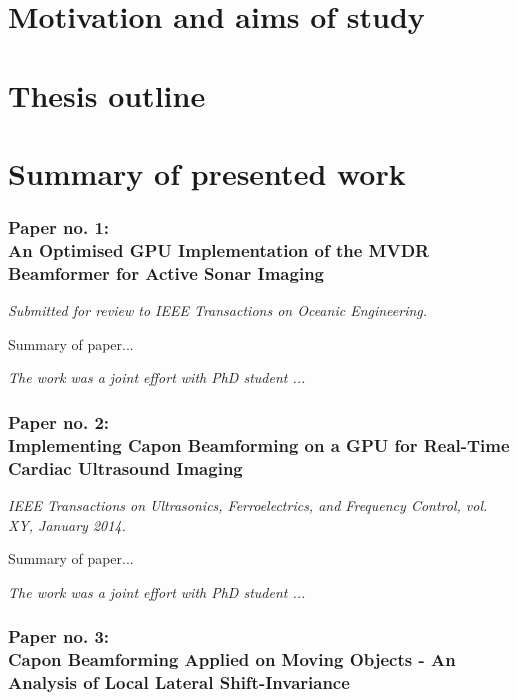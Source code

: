 \section{Motivation and aims of study}
\label{sec:motivationAndAims}

\section{Thesis outline}

\section{Summary of presented work}

\subsubsection{Paper no. 1:\\
An Optimised GPU Implementation of the MVDR Beamformer for Active Sonar Imaging}

{\it Submitted for review to IEEE Transactions on Oceanic Engineering.}
\vspace{0.3 cm}

Summary of paper...

\vspace{0.3 cm}
\emph{The work was a joint effort with PhD student ...}


\subsubsection{Paper no. 2:\\
Implementing Capon Beamforming on a GPU for Real-Time Cardiac Ultrasound Imaging}

{\it IEEE Transactions on Ultrasonics, Ferroelectrics, and Frequency Control, vol. XY, January 2014.}
\vspace{0.3 cm}

Summary of paper...
 
\vspace{0.3 cm}
\emph{The work was a joint effort with PhD student ...}

\subsubsection{Paper no. 3:\\
Capon Beamforming Applied on Moving Objects - An Analysis of Local Lateral Shift-Invariance}

